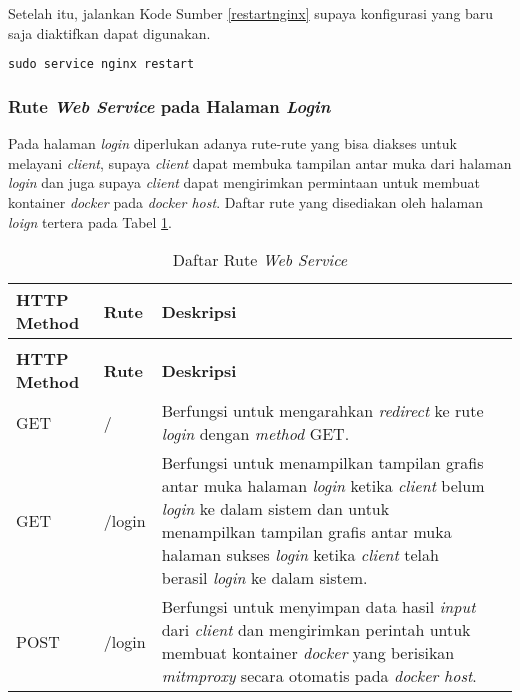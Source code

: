   Setelah itu, jalankan Kode Sumber \ref{restartnginx} supaya konfigurasi yang baru saja diaktifkan dapat digunakan.\\
  \begin{minipage}{\linewidth}
  \begin{lstlisting}[caption=Command untuk merestart Nginx,language=Python,label=restartnginx]
  sudo service nginx restart
  \end{lstlisting}
  \end{minipage}
  
  \subsubsection{Rute \textit{Web Service} pada Halaman \textit{Login}}
  Pada halaman \textit{login} diperlukan adanya rute-rute yang bisa diakses untuk melayani \textit{client}, supaya \textit{client} dapat membuka tampilan antar muka dari halaman \textit{login} dan juga supaya \textit{client} dapat mengirimkan permintaan untuk membuat kontainer \textit{docker} pada \textit{docker host}. Daftar rute yang disediakan oleh halaman \textit{loign} tertera pada Tabel \ref{tabelRuteWebServiceHalamnLogin}.\\
  \begin{longtable}{|p{}|p{}|p{}|p{}|} %
  	
  	\caption{Daftar Rute \textit{Web Service}} \label{tabelRuteWebServiceHalamnLogin} \\
  	\hline
  	\textbf{HTTP Method} & \textbf{Rute} & \textbf{Deskripsi} \\ \hline
  	
  	\endfirsthead
  	\caption[]{Daftar Rute \textit{Web Service}}  \\
  	\hline
  	\textbf{HTTP Method} & \textbf{Rute} & \textbf{Deskripsi}  \\ \hline
  	
  	\endhead
  	\endfoot
  	\endlastfoot
  	
  	GET & / & Berfungsi untuk mengarahkan \textit{redirect} ke rute \textit{login} dengan \textit{method} GET.\\ \hline
  	GET & /login & Berfungsi untuk menampilkan tampilan grafis antar muka halaman \textit{login} ketika \textit{client} belum \textit{login} ke dalam sistem dan untuk menampilkan tampilan grafis antar muka halaman sukses \textit{login} ketika \textit{client} telah berasil \textit{login} ke dalam sistem.\\ \hline
  	POST & /login & Berfungsi untuk menyimpan data hasil \textit{input} dari \textit{client} dan mengirimkan perintah untuk membuat kontainer \textit{docker} yang berisikan \textit{mitmproxy} secara otomatis pada \textit{docker host}.\\ \hline
  \end{longtable}
  
